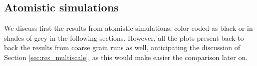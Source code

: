 \subsection{Atomistic simulations}

We discuss first the results from atomistic simulations, color coded as black or in shades of grey in the following sections. However, all the plots present back to back the results from coarse grain runs as well, anticipating the discussion of Section \ref{sec:res_multiscale}, as this would make easier the comparison later on.

\begin{figure}[p!]
\centering
{} 
 \\

\end{figure}
